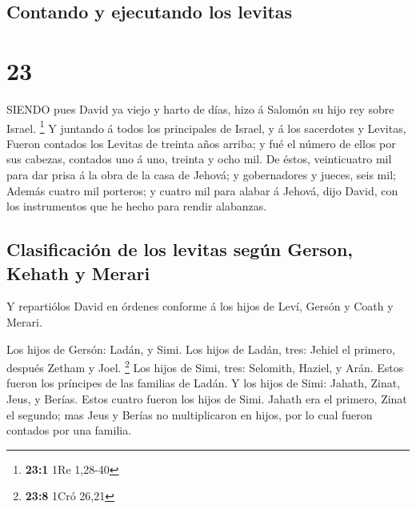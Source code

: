 \hypertarget{contando-y-ejecutando-los-levitas}{%
\subsection{Contando y ejecutando los
levitas}\label{contando-y-ejecutando-los-levitas}}

\hypertarget{section-22}{%
\section{23}\label{section-22}}

 SIENDO pues David ya viejo y harto de días, hizo á Salomón
su hijo rey sobre Israel. \footnote{\textbf{23:1} 1Re 1,28-40}
 Y juntando á todos los principales de Israel, y á los
sacerdotes y Levitas,  Fueron contados los Levitas de
treinta años arriba; y fué el número de ellos por sus cabezas, contados
uno á uno, treinta y ocho mil.  De éstos, veinticuatro mil
para dar prisa á la obra de la casa de Jehová; y gobernadores y jueces,
seis mil;  Además cuatro mil porteros; y cuatro mil para
alabar á Jehová, dijo David, con los instrumentos que he hecho para
rendir alabanzas.

\hypertarget{clasificaciuxf3n-de-los-levitas-seguxfan-gerson-kehath-y-merari}{%
\subsection{Clasificación de los levitas según Gerson, Kehath y
Merari}\label{clasificaciuxf3n-de-los-levitas-seguxfan-gerson-kehath-y-merari}}

 Y repartiólos David en órdenes conforme á los hijos de
Leví, Gersón y Coath y Merari.

 Los hijos de Gersón: Ladán, y Simi.  Los hijos
de Ladán, tres: Jehiel el primero, después Zetham y Joel. \footnote{\textbf{23:8}
  1Cró 26,21}  Los hijos de Simi, tres: Selomith, Haziel, y
Arán. Estos fueron los príncipes de las familias de Ladán. 
Y los hijos de Simi: Jahath, Zinat, Jeus, y Berías. Estos cuatro fueron
los hijos de Simi.  Jahath era el primero, Zinat el
segundo; mas Jeus y Berías no multiplicaron en hijos, por lo cual fueron
contados por una familia.

